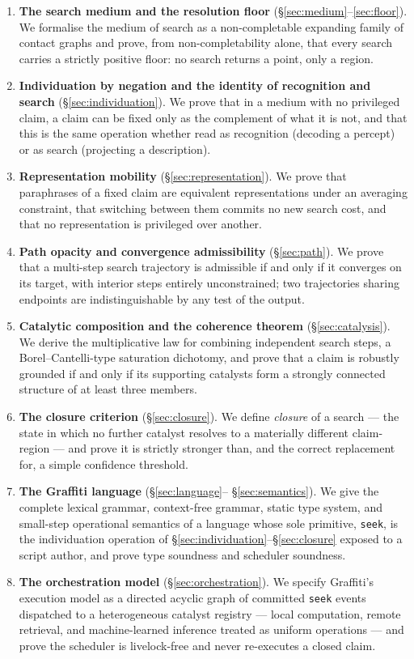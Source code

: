 \documentclass[11pt,twocolumn,a4paper]{article}
\theoremstyle{thmstyle}
\theoremstyle{definition}
\theoremstyle{remark}
\begin{document}
\begin{enumerate}[leftmargin=1.4em,itemsep=2pt]
\item \textbf{The search medium and the resolution floor}
  (\S\ref{sec:medium}--\ref{sec:floor}). We formalise the medium of search
  as a non-completable expanding family of contact graphs and prove, from
  non-completability alone, that every search carries a strictly positive
  floor: no search returns a point, only a region.
\item \textbf{Individuation by negation and the identity of recognition and
  search} (\S\ref{sec:individuation}). We prove that in a medium with no
  privileged claim, a claim can be fixed only as the complement of what it
  is not, and that this is the same operation whether read as recognition
  (decoding a percept) or as search (projecting a description).
\item \textbf{Representation mobility} (\S\ref{sec:representation}). We
  prove that paraphrases of a fixed claim are equivalent representations
  under an averaging constraint, that switching between them commits no
  new search cost, and that no representation is privileged over another.
\item \textbf{Path opacity and convergence admissibility}
  (\S\ref{sec:path}). We prove that a multi-step search trajectory is
  admissible if and only if it converges on its target, with interior
  steps entirely unconstrained; two trajectories sharing endpoints are
  indistinguishable by any test of the output.
\item \textbf{Catalytic composition and the coherence theorem}
  (\S\ref{sec:catalysis}). We derive the multiplicative law for combining
  independent search steps, a Borel--Cantelli-type saturation dichotomy,
  and prove that a claim is robustly grounded if and only if its supporting
  catalysts form a strongly connected structure of at least three members.
\item \textbf{The closure criterion} (\S\ref{sec:closure}). We define
  \emph{closure} of a search --- the state in which no further catalyst
  resolves to a materially different claim-region --- and prove it is
  strictly stronger than, and the correct replacement for, a simple
  confidence threshold.
\item \textbf{The Graffiti language} (\S\ref{sec:language}--%
  \S\ref{sec:semantics}). We give the complete lexical grammar,
  context-free grammar, static type system, and small-step operational
  semantics of a language whose sole primitive, \texttt{seek}, is the
  individuation operation of \S\ref{sec:individuation}--\S\ref{sec:closure}
  exposed to a script author, and prove type soundness and scheduler
  soundness.
\item \textbf{The orchestration model} (\S\ref{sec:orchestration}). We
  specify Graffiti's execution model as a directed acyclic graph of
  committed \texttt{seek} events dispatched to a heterogeneous catalyst
  registry --- local computation, remote retrieval, and machine-learned
  inference treated as uniform operations --- and prove the scheduler is
  livelock-free and never re-executes a closed claim.
\end{enumerate}
\end{document}
